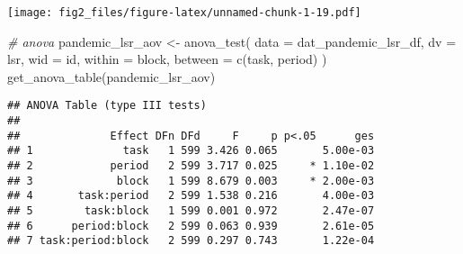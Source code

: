 \documentclass[
]{article}
\newenvironment{Shaded}{\begin{snugshade}}{\end{snugshade}}
\newcommand{\AttributeTok}[1]{\textcolor[rgb]{0.77,0.63,0.00}{#1}}
\newcommand{\CommentTok}[1]{\textcolor[rgb]{0.56,0.35,0.01}{\textit{#1}}}
\newcommand{\FunctionTok}[1]{\textcolor[rgb]{0.00,0.00,0.00}{#1}}
\newcommand{\NormalTok}[1]{#1}
\newcommand{\OtherTok}[1]{\textcolor[rgb]{0.56,0.35,0.01}{#1}}
\begin{document}
\texttt{[image: fig2\_files/figure-latex/unnamed-chunk-1-19.pdf]}

\begin{Shaded}
\begin{Highlighting}[]
\CommentTok{\# anova}
\NormalTok{pandemic\_lsr\_aov }\OtherTok{\textless{}{-}} \FunctionTok{anova\_test}\NormalTok{(}
  \AttributeTok{data =}\NormalTok{ dat\_pandemic\_lsr\_df, }\AttributeTok{dv =}\NormalTok{ lsr, }\AttributeTok{wid =}\NormalTok{ id,}
  \AttributeTok{within =}\NormalTok{ block, }\AttributeTok{between =} \FunctionTok{c}\NormalTok{(task, period)}
\NormalTok{)}
\FunctionTok{get\_anova\_table}\NormalTok{(pandemic\_lsr\_aov)}
\end{Highlighting}
\end{Shaded}

\begin{verbatim}
## ANOVA Table (type III tests)
## 
##              Effect DFn DFd     F     p p<.05      ges
## 1              task   1 599 3.426 0.065       5.00e-03
## 2            period   2 599 3.717 0.025     * 1.10e-02
## 3             block   1 599 8.679 0.003     * 2.00e-03
## 4       task:period   2 599 1.538 0.216       4.00e-03
## 5        task:block   1 599 0.001 0.972       2.47e-07
## 6      period:block   2 599 0.063 0.939       2.61e-05
## 7 task:period:block   2 599 0.297 0.743       1.22e-04
\end{verbatim}
\end{document}
